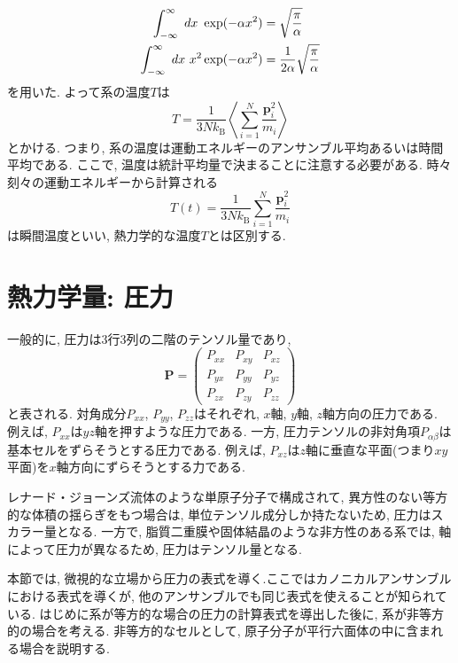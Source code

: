 \begin{align}
  \int_{-\infty}^{\infty}~dx~ \exp(-\alpha x^{2})
&=\sqrt{\frac{\pi}{\alpha}}
  \notag
  \\
  \int_{-\infty}^{\infty}~dx~ x^{2} \exp(-\alpha x^{2})
&=\frac{1}{2\alpha}\sqrt{\frac{\pi}{\alpha}}
  \notag
\end{align}
を用いた. よって系の温度$T$は
\begin{equation}
 T
=\frac{1}{3N k_{\mathrm{B}}}
 \left\langle \sum_{i=1}^{N} \frac{\bm{p}_{i}^{2}}{m_{i}} \right\rangle
\end{equation}
とかける.
つまり, 系の温度は運動エネルギーのアンサンブル平均あるいは時間平均である.
ここで, 温度は統計平均量で決まることに注意する必要がある.
時々刻々の運動エネルギーから計算される
\begin{equation}
 T(t)
=\frac{1}{3N k_{\mathrm{B}}}
 \sum_{i=1}^{N} \frac{\bm{p}_{i}^{2}}{m_{i}}
\end{equation}
は瞬間温度といい, 熱力学的な温度$T$とは区別する.

\section{熱力学量: 圧力}
一般的に, 圧力は3行3列の二階のテンソル量であり, 
\begin{equation}
  \bm{P}
  =
  \left(
    \begin{array}{ccc}
       P_{xx} & P_{xy} & P_{xz} \\
       P_{yx} & P_{yy} & P_{yz} \\
       P_{zx} & P_{zy} & P_{zz}
    \end{array}
\right)
\end{equation}
と表される. 対角成分$P_{xx}$, $P_{yy}$, $P_{zz}$はそれぞれ, $x$軸, $y$軸, $z$軸方向の圧力である. 例えば, $P_{xx}$は$yz$軸を押すような圧力である. 
一方, 圧力テンソルの非対角項$P_{\alpha\beta}$は基本セルをずらそうとする圧力である. 例えば, $P_{xz}$は$z$軸に垂直な平面(つまり$xy$平面)を$x$軸方向にずらそうとする力である. 

レナード・ジョーンズ流体のような単原子分子で構成されて, 異方性のない等方的な体積の揺らぎをもつ場合は, 単位テンソル成分しか持たないため, 圧力はスカラー量となる.
一方で, 脂質二重膜や固体結晶のような非方性のある系では, 軸によって圧力が異なるため, 圧力はテンソル量となる. 

本節では, 微視的な立場から圧力の表式を導く.ここではカノニカルアンサンブルにおける表式を導くが,
他のアンサンブルでも同じ表式を使えることが知られている.
はじめに系が等方的な場合の圧力の計算表式を導出した後に, 系が非等方的の場合を考える. 非等方的なセルとして, 原子分子が平行六面体の中に含まれる場合を説明する.

